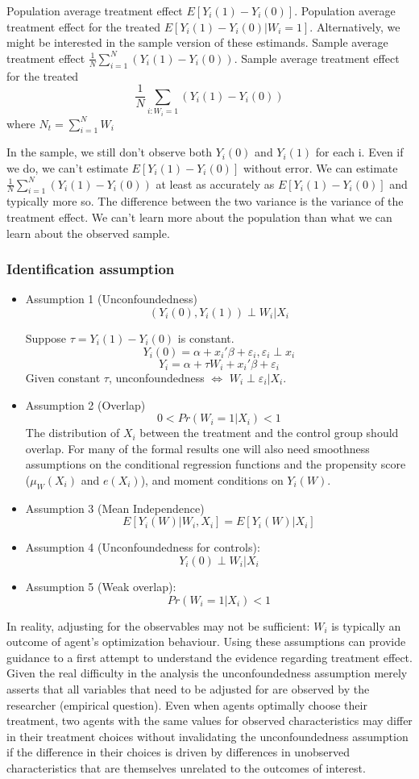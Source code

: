 \documentclass[11pt, a4paper, oneside]{article}
\theoremstyle{definition}
\theoremstyle{proposition}
\theoremstyle{corollary}
\theoremstyle{lemma}
\theoremstyle{theorem}
\begin{document}
Population average treatment effect $E[Y_i(1) - Y_i(0)]$. Population average treatment effect for the treated $E[Y_i(1)-Y_i(0)|W_i=1]$. Alternatively, we might be interested in the sample version of these estimands. Sample average treatment effect $\frac{1}{N}\sum_{i=1}^N (Y_i(1) - Y_i(0))$. Sample average treatment effect for the treated $$\frac{1}{N}\sum_{i:W_i=1}(Y_i(1)-Y_i(0))$$ where $N_t = \sum_{i=1}^N W_i$ 

In the sample, we still don't observe both $Y_i(0)$ and $Y_i(1)$ for each i. Even if we do, we can't estimate $E[Y_i(1) - Y_i(0)]$ without error. We can estimate $\frac{1}{N}\sum_{i=1}^N (Y_i(1) - Y_i(0))$ at least as accurately as $E[Y_i(1) - Y_i(0)]$ and typically more so. The difference between the two variance is the variance of the treatment effect. We can't learn more about the population than what we can learn about the observed sample. 

\subsubsection{Identification assumption}
\begin{itemize}
\item Assumption 1 (Unconfoundedness)
$$(Y_i(0), Y_i(1))\perp W_i|X_i$$ 

Suppose $\tau= Y_i(1) - Y_i(0)$ is constant.
$$Y_i(0) = \alpha + x_i'\beta + \varepsilon_i, \varepsilon_i \perp x_i$$
$$Y_i = \alpha +\tau W_i + x_i'\beta + \varepsilon_i$$
Given constant $\tau$, unconfoundedness $\iff$ $W_i \perp \varepsilon_i|X_i$. 
\item Assumption 2 (Overlap)
$$0 < Pr(W_i = 1|X_i) < 1$$
The distribution of $X_i$ between the treatment and the control group should overlap. For many of the formal results one will also need smoothness assumptions on the conditional regression functions and the propensity score ($\mu_W(X_i)$ and $e(X_i)$), and moment conditions on $Y_i(W)$. 
\item Assumption 3 (Mean Independence)
$$E[Y_i(W)|W_i, X_i] = E[Y_i(W)|X_i]$$
\item Assumption 4 (Unconfoundedness for controls):
$$Y_i(0)\perp W_i |X_i$$
\item Assumption 5 (Weak overlap):
$$Pr(W_i = 1|X_i) < 1$$
\end{itemize}

In reality, adjusting for the observables may not be sufficient: $W_i$ is typically an outcome of agent's optimization behaviour. Using these assumptions can provide guidance to a first attempt to understand the evidence regarding treatment effect. Given the real difficulty in the analysis the unconfoundedness assumption merely asserts that all variables that need to be adjusted for are observed by the researcher (empirical question). Even when agents optimally choose their treatment, two agents with the same values for observed characteristics may differ in their treatment choices without invalidating the unconfoundedness assumption if the difference in their choices is driven by differences in unobserved characteristics that are themselves unrelated to the outcomes of interest. 
\end{document}
